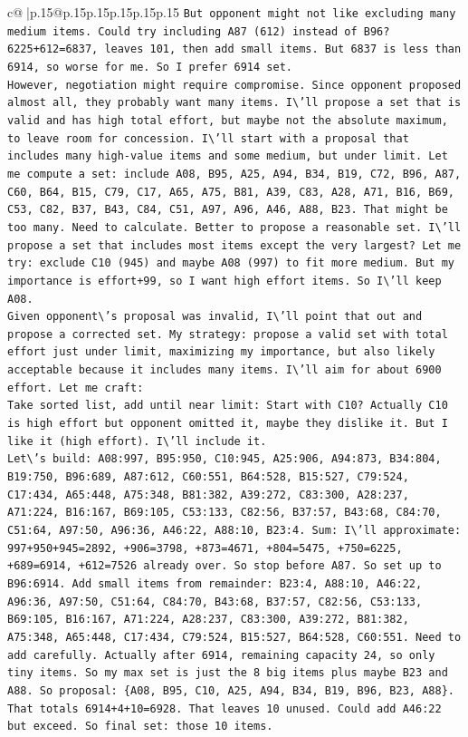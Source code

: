 \documentclass{article}
\begin{document}
{\begin{supertabular}{c@{$\;$}|p{.15\linewidth}@{}p{.15\linewidth}p{.15\linewidth}p{.15\linewidth}p{.15\linewidth}p{.15\linewidth}}
{{{\texttt{But opponent might not like excluding many medium items. Could try including A87 (612) instead of B96? 6225+612=6837, leaves 101, then add small items. But 6837 is less than 6914, so worse for me. So I prefer 6914 set. } \\
\texttt{However, negotiation might require compromise. Since opponent proposed almost all, they probably want many items. I\textbackslash{}'ll propose a set that is valid and has high total effort, but maybe not the absolute maximum, to leave room for concession. I\textbackslash{}'ll start with a proposal that includes many high{-}value items and some medium, but under limit. Let me compute a set: include A08, B95, A25, A94, B34, B19, C72, B96, A87, C60, B64, B15, C79, C17, A65, A75, B81, A39, C83, A28, A71, B16, B69, C53, C82, B37, B43, C84, C51, A97, A96, A46, A88, B23. That might be too many. Need to calculate. Better to propose a reasonable set. I\textbackslash{}'ll propose a set that includes most items except the very largest? Let me try: exclude C10 (945) and maybe A08 (997) to fit more medium. But my importance is effort+99, so I want high effort items. So I\textbackslash{}'ll keep A08. } \\
\texttt{Given opponent\textbackslash{}'s proposal was invalid, I\textbackslash{}'ll point that out and propose a corrected set. My strategy: propose a valid set with total effort just under limit, maximizing my importance, but also likely acceptable because it includes many items. I\textbackslash{}'ll aim for about 6900 effort. Let me craft: } \\
\texttt{Take sorted list, add until near limit: Start with C10? Actually C10 is high effort but opponent omitted it, maybe they dislike it. But I like it (high effort). I\textbackslash{}'ll include it. } \\
\texttt{Let\textbackslash{}'s build: A08:997, B95:950, C10:945, A25:906, A94:873, B34:804, B19:750, B96:689, A87:612, C60:551, B64:528, B15:527, C79:524, C17:434, A65:448, A75:348, B81:382, A39:272, C83:300, A28:237, A71:224, B16:167, B69:105, C53:133, C82:56, B37:57, B43:68, C84:70, C51:64, A97:50, A96:36, A46:22, A88:10, B23:4. Sum: I\textbackslash{}'ll approximate: 997+950+945=2892, +906=3798, +873=4671, +804=5475, +750=6225, +689=6914, +612=7526 already over. So stop before A87. So set up to B96:6914. Add small items from remainder: B23:4, A88:10, A46:22, A96:36, A97:50, C51:64, C84:70, B43:68, B37:57, C82:56, C53:133, B69:105, B16:167, A71:224, A28:237, C83:300, A39:272, B81:382, A75:348, A65:448, C17:434, C79:524, B15:527, B64:528, C60:551. Need to add carefully. Actually after 6914, remaining capacity 24, so only tiny items. So my max set is just the 8 big items plus maybe B23 and A88. So proposal: \{A08, B95, C10, A25, A94, B34, B19, B96, B23, A88\}. That totals 6914+4+10=6928. That leaves 10 unused. Could add A46:22 but exceed. So final set: those 10 items. } \\
}}}
\end{supertabular}}
\end{document}
